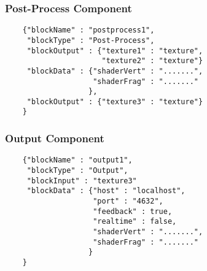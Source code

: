 \subsubsection{Post-Process Component}
\begin{lstlisting}
    {"blockName" : "postprocess1",
     "blockType" : "Post-Process",
     "blockOutput" : {"texture1" : "texture",
                      "texture2" : "texture"}
     "blockData" : {"shaderVert" : ".......",
                    "shaderFrag" : "......."
                   },
     "blockOutput" : {"texture3" : "texture"}
    }
\end{lstlisting}

\subsubsection{Output Component}
\begin{lstlisting}
    {"blockName" : "output1",
     "blockType" : "Output",
     "blockInput" : "texture3"
     "blockData" : {"host" : "localhost",
                    "port" : "4632",
                    "feedback" : true,
                    "realtime" : false,
                    "shaderVert" : ".......",
                    "shaderFrag" : "......."
                   }
    }
\end{lstlisting}

